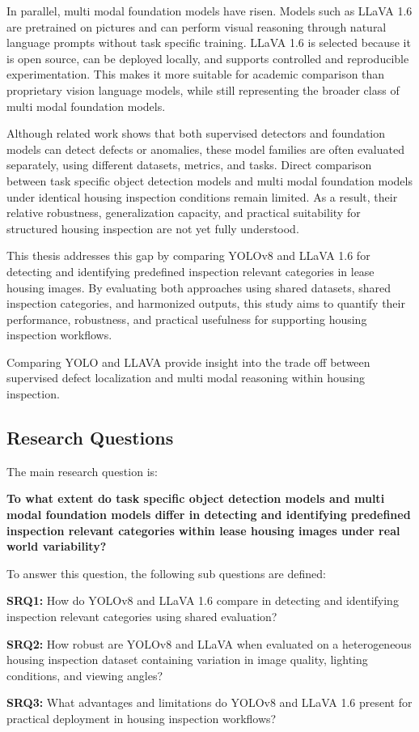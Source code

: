 In parallel, multi modal foundation models have risen. Models such as LLaVA 1.6 \cite{liu_visual_2023,radford_clip_2021} are pretrained on pictures and can perform visual reasoning through natural language prompts without task specific training. LLaVA 1.6 is selected because it is open source, can be deployed locally, and supports controlled and reproducible experimentation. This makes it more suitable for academic comparison than proprietary vision language models, while still representing the broader class of multi modal foundation models.

Although related work shows that both supervised detectors\cite{kang_improvement_2025,wen_autonomous_2024} and foundation models\cite{jiang_mmad_2025,malla_enhancing_2025,radford_clip_2021} can detect defects or anomalies, these model families are often evaluated separately, using different datasets, metrics, and tasks. Direct comparison between task specific object detection models and multi modal foundation models under identical housing inspection conditions remain limited. As a result, their relative robustness, generalization capacity, and practical suitability for structured housing inspection are not yet fully understood.

This thesis addresses this gap by comparing YOLOv8 and LLaVA 1.6 for detecting and identifying predefined inspection relevant categories in lease housing images. By evaluating both approaches using shared datasets, shared inspection categories, and harmonized outputs, this study aims to quantify their performance, robustness, and practical usefulness for supporting housing inspection workflows.

Comparing YOLO and LLAVA provide insight into the trade off between supervised defect localization and multi modal reasoning within housing inspection.

\subsection{Research Questions}

The main research question is:

\textbf{To what extent do task specific object detection models and multi modal foundation models differ in detecting and identifying predefined inspection relevant categories within lease housing images under real world variability?}

To answer this question, the following sub questions are defined:

\textbf{SRQ1:} How do YOLOv8 and LLaVA 1.6 compare in detecting and identifying inspection relevant categories using shared evaluation?

\textbf{SRQ2:} How robust are YOLOv8 and LLaVA when evaluated on a heterogeneous housing inspection dataset containing variation in image quality, lighting conditions, and viewing angles?

\textbf{SRQ3:} What advantages and limitations do YOLOv8 and LLaVA 1.6 present for practical deployment in housing inspection workflows?
